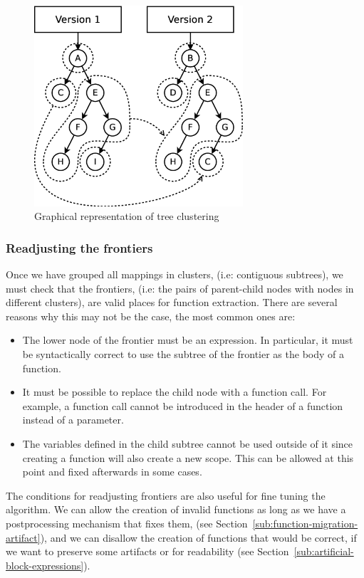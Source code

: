 \begin{figure}
\begin{centering}
\includegraphics[width=0.69\textwidth]{figures/automatic_beh_inf/diagrams/dia3}
\par\end{centering}

\caption{Graphical representation of tree clustering\label{fig:tree-clustering-example}}
\end{figure}



\subsubsection{Readjusting the frontiers}

Once we have grouped all mappings in clusters, (i.e: contiguous subtrees),
we must check that the frontiers, (i.e: the pairs of parent-child
nodes with nodes in different clusters), are valid places for function
extraction. There are several reasons why this may not be the case,
the most common ones are:
\begin{itemize}
\item The lower node of the frontier must be an expression. In particular,
it must be syntactically correct to use the subtree of the frontier
as the body of a function.
\item It must be possible to replace the child node with a function call.
For example, a function call cannot be introduced in the header of
a function instead of a parameter.
\item The variables defined in the child subtree cannot be used outside
of it since creating a function will also create a new scope. This
can be allowed at this point and fixed afterwards in some cases.
\end{itemize}
The conditions for readjusting frontiers are also useful for fine
tuning the algorithm. We can allow the creation of invalid functions
as long as we have a postprocessing mechanism that fixes them, (see
Section~\ref{sub:function-migration-artifact}), and we can disallow
the creation of functions that would be correct, if we want to preserve
some artifacts or for readability (see
Section~\ref{sub:artificial-block-expressions}).

